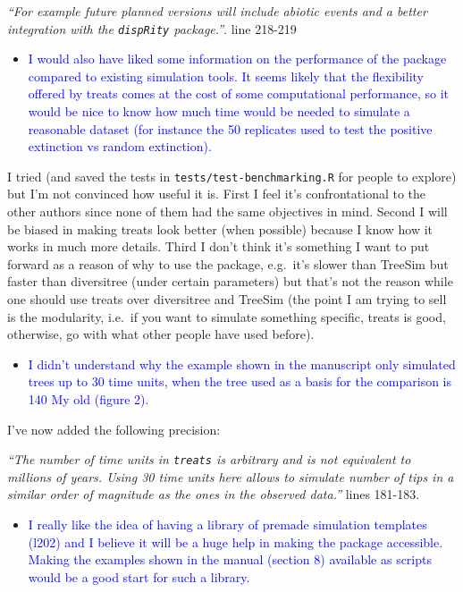 \documentclass[
]{article}
\providecommand{\tightlist}{%
  \setlength{\itemsep}{0pt}\setlength{\parskip}{0pt}}
\begin{document}
\emph{``For example future planned versions will include abiotic events
and a better integration with the \texttt{dispRity} package.''}. line
218-219

\begin{itemize}
\tightlist
\item
  \textcolor{blue}{I would also have liked some information on the performance of the
  package compared to existing simulation tools. It seems likely that
  the flexibility offered by treats comes at the cost of some
  computational performance, so it would be nice to know how much time
  would be needed to simulate a reasonable dataset (for instance the 50
  replicates used to test the positive extinction vs random
  extinction).}
\end{itemize}

I tried (and saved the tests in \texttt{tests/test-benchmarking.R} for
people to explore) but I'm not convinced how useful it is. First I feel
it's confrontational to the other authors since none of them had the
same objectives in mind. Second I will be biased in making treats look
better (when possible) because I know how it works in much more details.
Third I don't think it's something I want to put forward as a reason of
why to use the package, e.g.~it's slower than TreeSim but faster than
diversitree (under certain parameters) but that's not the reason while
one should use treats over diversitree and TreeSim (the point I am
trying to sell is the modularity, i.e.~if you want to simulate something
specific, treats is good, otherwise, go with what other people have used
before).

\begin{itemize}
\tightlist
\item
  \textcolor{blue}{I didn't understand why the example shown in the manuscript only
  simulated trees up to 30 time units, when the tree used as a basis for
  the comparison is 140 My old (figure 2).}
\end{itemize}

I've now added the following precision:

\emph{``The number of time units in \texttt{treats} is arbitrary and is
not equivalent to millions of years. Using 30 time units here allows to
simulate number of tips in a similar order of magnitude as the ones in
the observed data.''} lines 181-183.

\begin{itemize}
\tightlist
\item
  \textcolor{blue}{I really like the idea of having a library of premade simulation
  templates (l202) and I believe it will be a huge help in making the
  package accessible. Making the examples shown in the manual (section
  8) available as scripts would be a good start for such a library.}
\end{itemize}
\end{document}
